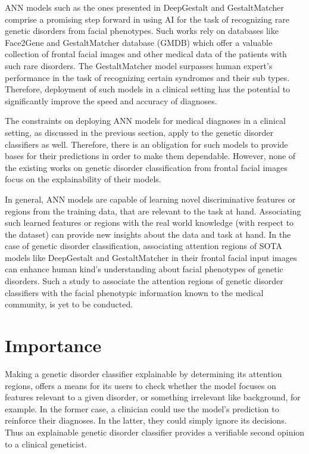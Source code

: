 \documentclass[../report.tex]{subfiles}
\begin{document}
    ANN models such as the ones presented in DeepGestalt \cite{Gurovich2019} and GestaltMatcher \cite{hsieh2022gestaltmatcher} comprise a promising step forward in using AI for the task of recognizing rare genetic disorders from facial phenotypes. Such works rely on databases like Face2Gene \cite{face2gene} and GestaltMatcher database (GMDB) \cite{gmdb}  which offer a valuable collection of frontal facial images and other medical data of the patients with such rare disorders. The GestaltMatcher \cite{hsieh2022gestaltmatcher} model surpasses human expert's performance in the task of recognizing certain syndromes and their sub types. Therefore, deployment of such models in a clinical setting has the potential to significantly improve the speed and accuracy of diagnoses.
    
    The constraints on deploying ANN models for medical diagnoses in a clinical setting, as discussed in the previous section, apply to the genetic disorder classifiers as well. Therefore, there is an obligation for such models to provide bases for their predictions in order to make them dependable. However, none of the existing works on genetic disorder classification from frontal facial images focus on the explainability of their models.
    
    In general, ANN models are capable of learning novel discriminative features or regions from the training data, that are relevant to the task at hand. Associating such learned features or regions with the real world knowledge (with respect to the dataset) can provide new insights about the data and task at hand. In the case of genetic disorder classification, associating attention regions of SOTA models like DeepGestalt \cite{Gurovich2019} and GestaltMatcher \cite{hsieh2022gestaltmatcher} in their frontal facial input images can enhance human kind's understanding about facial phenotypes of genetic disorders. Such a study to associate the attention regions of genetic disorder classifiers with the facial phenotypic information known to the medical community, is yet to be conducted.
    
    \section{Importance} \label{sec_importance}
    Making a genetic disorder classifier explainable by determining its attention regions, offers a means for its users to check whether the model focuses on features relevant to a given disorder, or something irrelevant like background, for example. In the former case, a clinician could use the model's prediction to reinforce their diagnoses. In the latter, they could simply ignore its decisions. Thus an explainable genetic disorder classifier provides a verifiable second opinion to a clinical geneticist.
    
\end{document}
